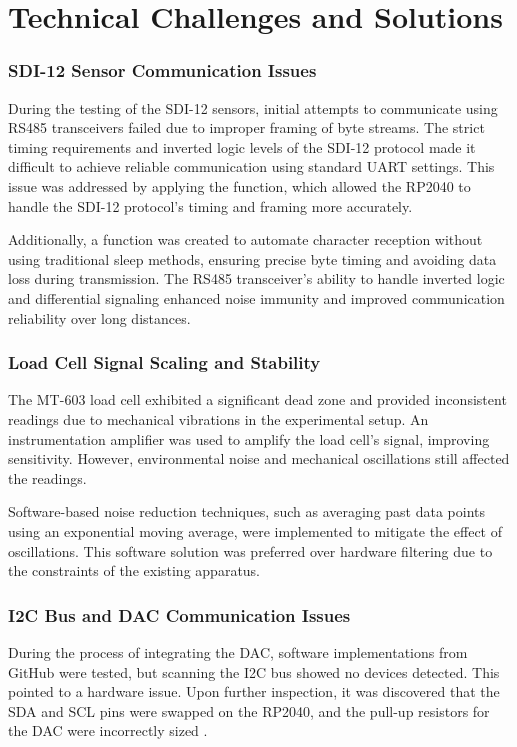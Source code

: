 \section{Technical Challenges and Solutions}

\subsubsection{SDI-12 Sensor Communication Issues}
During the testing of the SDI-12 sensors, initial attempts to communicate using RS485 transceivers failed due to improper framing of byte streams. The strict timing requirements and inverted logic levels of the SDI-12 protocol made it difficult to achieve reliable communication using standard UART settings. This issue was addressed by applying the  function, which allowed the RP2040 to handle the SDI-12 protocol's timing and framing more accurately.

Additionally, a  function was created to automate character reception without using traditional sleep methods, ensuring precise byte timing and avoiding data loss during transmission. The RS485 transceiver's ability to handle inverted logic and differential signaling enhanced noise immunity and improved communication reliability over long distances.

\subsubsection{Load Cell Signal Scaling and Stability}
The MT-603 load cell exhibited a significant dead zone and provided inconsistent readings due to mechanical vibrations in the experimental setup. An instrumentation amplifier was used to amplify the load cell's signal, improving sensitivity. However, environmental noise and mechanical oscillations still affected the readings.

Software-based noise reduction techniques, such as averaging past data points using an exponential moving average, were implemented to mitigate the effect of oscillations. This software solution was preferred over hardware filtering due to the constraints of the existing apparatus.

\subsubsection{I2C Bus and DAC Communication Issues}
During the process of integrating the DAC, software implementations from GitHub were tested, but scanning the I2C bus showed no devices detected. This pointed to a hardware issue. Upon further inspection, it was discovered that the SDA and SCL pins were swapped on the RP2040, and the pull-up resistors for the DAC were incorrectly sized \cite{DAC_datasheet}.

